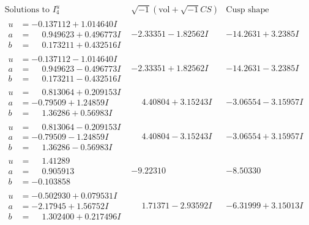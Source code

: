 \documentclass[1p]{elsarticle_modified}
\theoremstyle{definition}
\newcommand{\I}{\sqrt{-1}}
\begin{document}
$$\begin{array}{c|c|c}  
\text{Solutions to }I^u_{4}& \I (\text{vol} + \sqrt{-1}CS) & \text{Cusp shape}\\
 \hline 
\begin{aligned}
u &= -0.137112 + 1.014640 I \\
a &= \phantom{-}0.949623 + 0.496773 I \\
b &= \phantom{-}0.173211 + 0.432516 I\end{aligned}
 & -2.33351 - 1.82562 I & -14.2631 + 3.2385 I \\ \hline\begin{aligned}
u &= -0.137112 - 1.014640 I \\
a &= \phantom{-}0.949623 - 0.496773 I \\
b &= \phantom{-}0.173211 - 0.432516 I\end{aligned}
 & -2.33351 + 1.82562 I & -14.2631 - 3.2385 I \\ \hline\begin{aligned}
u &= \phantom{-}0.813064 + 0.209153 I \\
a &= -0.79509 + 1.24859 I \\
b &= \phantom{-}1.36286 + 0.56983 I\end{aligned}
 & \phantom{-}4.40804 + 3.15243 I & -3.06554 - 3.15957 I \\ \hline\begin{aligned}
u &= \phantom{-}0.813064 - 0.209153 I \\
a &= -0.79509 - 1.24859 I \\
b &= \phantom{-}1.36286 - 0.56983 I\end{aligned}
 & \phantom{-}4.40804 - 3.15243 I & -3.06554 + 3.15957 I \\ \hline\begin{aligned}
u &= \phantom{-}1.41289\phantom{ +0.000000I} \\
a &= \phantom{-}0.905913\phantom{ +0.000000I} \\
b &= -0.103858\phantom{ +0.000000I}\end{aligned}
 & -9.22310\phantom{ +0.000000I} & -8.50330\phantom{ +0.000000I} \\ \hline\begin{aligned}
u &= -0.502930 + 0.079531 I \\
a &= -2.17945 + 1.56752 I \\
b &= \phantom{-}1.302400 + 0.217496 I\end{aligned}
 & \phantom{-}1.71371 - 2.93592 I & -6.31999 + 3.15013 I \\ \hline\begin{aligned}

\end{aligned}
\end{array}$$
\end{document}
